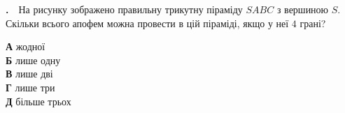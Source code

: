 \documentclass[12pt]{article}
\newenvironment{nmtfit}{\begin{lrbox}{\nmtfitbox}}{\end{lrbox}%
  \ifdim\wd\nmtfitbox>\linewidth \resizebox{\linewidth}{!}{\usebox{\nmtfitbox}}\else\usebox{\nmtfitbox}\fi}
\newcounter{zad}
\newcommand{\zadnum}{\stepcounter{zad}\textbf{\thezad.}\ \ }
\newcommand{\nbvspace}[1]{\nopagebreak\vspace{#1}}
\begin{document}
\begin{samepage}
\noindent
\begin{minipage}[c]{0.60\textwidth}
\zadnum На рисунку зображено правильну трикутну піраміду $SABC$ з вершиною $S$. Скільки всього апофем можна провести в цій піраміді, якщо у неї $4$ грані?
\end{minipage}%
\hfill
\begin{minipage}[c]{0.38\textwidth}
\centering
\begin{nmtfit}\end{nmtfit}
\end{minipage}
\par\nbvspace{0.2cm}
\begin{flushleft}
\textbf{А} \quad жодної \\[0.1cm]
\textbf{Б} \quad лише одну \\[0.1cm]
\textbf{В} \quad лише дві \\[0.1cm]
\textbf{Г} \quad лише три \\[0.1cm]
\textbf{Д} \quad більше трьох
\end{flushleft}

\par{}
\end{samepage}
\endgroup
\end{document}
